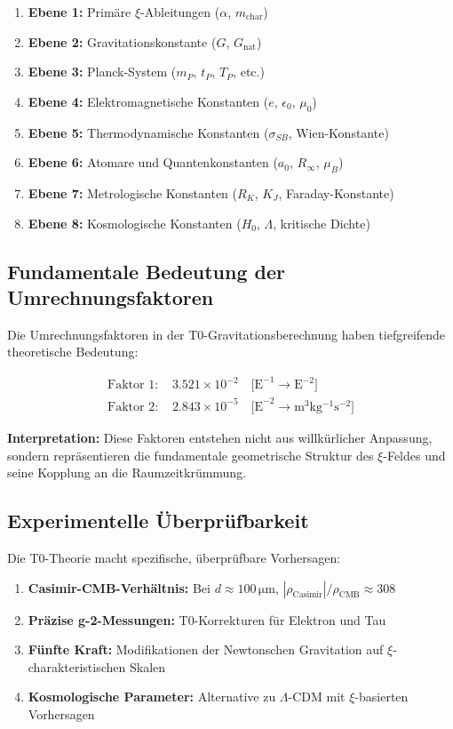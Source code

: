 	\begin{enumerate}
		\item \textbf{Ebene 1:} Primäre $\xi$-Ableitungen ($\alpha$, $m_{\text{char}}$)
		\item \textbf{Ebene 2:} Gravitationskonstante ($G$, $G_{\text{nat}}$)
		\item \textbf{Ebene 3:} Planck-System ($m_P$, $t_P$, $T_P$, etc.)
		\item \textbf{Ebene 4:} Elektromagnetische Konstanten ($e$, $\epsilon_0$, $\mu_0$)
		\item \textbf{Ebene 5:} Thermodynamische Konstanten ($\sigma_{SB}$, Wien-Konstante)
		\item \textbf{Ebene 6:} Atomare und Quantenkonstanten ($a_0$, $R_\infty$, $\mu_B$)
		\item \textbf{Ebene 7:} Metrologische Konstanten ($R_K$, $K_J$, Faraday-Konstante)
		\item \textbf{Ebene 8:} Kosmologische Konstanten ($H_0$, $\Lambda$, kritische Dichte)
	\end{enumerate}
	
	\subsection{Fundamentale Bedeutung der Umrechnungsfaktoren}
	
	Die Umrechnungsfaktoren in der T0-Gravitationsberechnung haben tiefgreifende theoretische Bedeutung:
	
	\begin{align}
		\text{Faktor 1: } &3.521 \times 10^{-2} \quad \text{[E}^{-1} \rightarrow \text{E}^{-2}\text{]} \\
		\text{Faktor 2: } &2.843 \times 10^{-5} \quad \text{[E}^{-2} \rightarrow \si{\meter^3 \kilogram^{-1} \second^{-2}}\text{]}
	\end{align}
	
	\textbf{Interpretation:} Diese Faktoren entstehen nicht aus willkürlicher Anpassung, sondern repräsentieren die fundamentale geometrische Struktur des $\xi$-Feldes und seine Kopplung an die Raumzeitkrümmung.
	
	\subsection{Experimentelle Überprüfbarkeit}
	
	Die T0-Theorie macht spezifische, überprüfbare Vorhersagen:
	
	\begin{enumerate}
		\item \textbf{Casimir-CMB-Verhältnis:} Bei $d \approx 100\,\si{\micro\meter}$, $|\rho_{\text{Casimir}}|/\rho_{\text{CMB}} \approx 308$
		\item \textbf{Präzise g-2-Messungen:} T0-Korrekturen für Elektron und Tau
		\item \textbf{Fünfte Kraft:} Modifikationen der Newtonschen Gravitation auf $\xi$-charakteristischen Skalen
		\item \textbf{Kosmologische Parameter:} Alternative zu $\Lambda$-CDM mit $\xi$-basierten Vorhersagen
	\end{enumerate}
	

